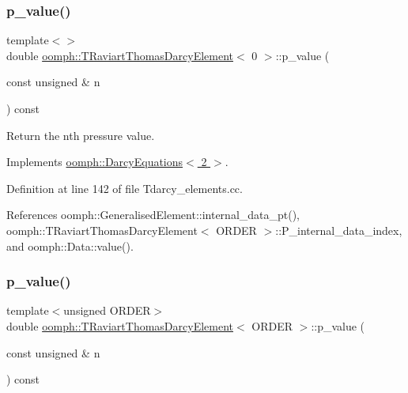 \mbox{\label{classoomph_1_1TRaviartThomasDarcyElement_aa21b6aad78ec35c661c69fb67700b7e1}} 
\subsubsection{\texorpdfstring{p\+\_\+value()}{p\_value()}\hspace{0.1cm}{\footnotesize\ttfamily [1/3]}}
{\footnotesize\ttfamily template$<$$>$ \\
double \hyperlink{classoomph_1_1TRaviartThomasDarcyElement}{oomph\+::\+T\+Raviart\+Thomas\+Darcy\+Element}$<$ 0 $>$\+::p\+\_\+value (\begin{DoxyParamCaption}\item[{const unsigned \&}]{n }\end{DoxyParamCaption}) const\hspace{0.3cm}{\ttfamily [virtual]}}



Return the nth pressure value. 



Implements \hyperlink{classoomph_1_1DarcyEquations_a788824ffa37b4fcae4d45eee75f2c39e}{oomph\+::\+Darcy\+Equations$<$ 2 $>$}.



Definition at line 142 of file Tdarcy\+\_\+elements.\+cc.



References oomph\+::\+Generalised\+Element\+::internal\+\_\+data\+\_\+pt(), oomph\+::\+T\+Raviart\+Thomas\+Darcy\+Element$<$ O\+R\+D\+E\+R $>$\+::\+P\+\_\+internal\+\_\+data\+\_\+index, and oomph\+::\+Data\+::value().

\mbox{\label{classoomph_1_1TRaviartThomasDarcyElement_a4d1ad5a3473c1d8e4b477bedf5cb88d5}} 
\subsubsection{\texorpdfstring{p\+\_\+value()}{p\_value()}\hspace{0.1cm}{\footnotesize\ttfamily [2/3]}}
{\footnotesize\ttfamily template$<$unsigned O\+R\+D\+ER$>$ \\
double \hyperlink{classoomph_1_1TRaviartThomasDarcyElement}{oomph\+::\+T\+Raviart\+Thomas\+Darcy\+Element}$<$ O\+R\+D\+ER $>$\+::p\+\_\+value (\begin{DoxyParamCaption}\item[{const unsigned \&}]{n }\end{DoxyParamCaption}) const\hspace{0.3cm}{\ttfamily [virtual]}}



